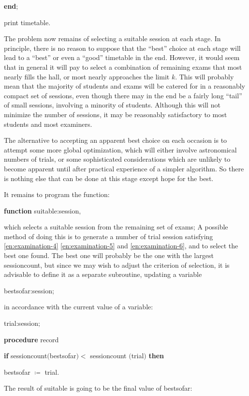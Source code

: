 \documentclass[twoside,11pt]{book}
\begin{document}
\quad \quad \textbf{end};

\quad print timetable.

The problem now remains of selecting a suitable session at each stage. In principle, there is no reason to suppose that the ``best'' choice at each stage will lead to a ``best'' or even a ``good'' timetable in the end. However, it would seem that in general it will pay to select a combination of remaining exams that most nearly fills the hall, or most nearly approaches the limit $k$. This will probably mean that the majority of students and exams will be catered for in a reasonably compact set of sessions, even though there may in the end be a fairly long ``tail'' of small sessions, involving a minority of students. Although this will not minimize the number of sessions, it may be reasonably satisfactory to most students and most examiners.

The alternative to accepting an apparent best choice on each occasion is to attempt some more global optimization, which will either involve astronomical numbers of trials, or some sophisticated considerations which are unlikely to become apparent until after practical experience of a simpler algorithm. So there is nothing else that can be done at this stage except hope for the best.

It remains to program the function:

\quad \textbf{function} suitable:session,

\noindent
which selects a suitable session from the remaining set of exams; A possible method of doing this is to generate a number of trial session satisfying \ref{en:examination-4} \ref{en:examination-5} and \ref{en:examination-6}, and to select the best one found. The best one will probably be the one with the largest sessioncount, but since we may wish to adjust the criterion of selection, it is advisable to define it as a separate subroutine, updating a variable

\quad bestsofar:session;

\noindent
in accordance with the current value of a variable:

\quad trial:session;

\quad \textbf{procedure} record

\quad \quad \textbf{if} sessioncount$($bestsofar$) <$ sessioncount $($trial$)$ \textbf{then}

\quad \quad \quad bestsofar $\coloneq$ trial.

\noindent
The result of suitable is going to be the final value of bestsofar:
\end{document}
